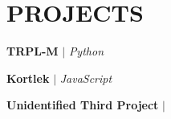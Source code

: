 \section{\textbf {\large PROJECTS}}
\resumeSubHeadingListStart %

    
    \resumeProjectHeading %
    {\textbf{TRPL-M} $|$ \emph{Python}}{}
    \resumeItemListStart %
        \resumeItem{}
        \resumeItem{}
        \resumeItem{}
    \resumeItemListEnd %

    \resumeProjectHeading %
    {\textbf{Kortlek} $|$ \emph{JavaScript}}{}
    \resumeItemListStart %
        \resumeItem{}
        \resumeItem{}
        \resumeItem{}
    \resumeItemListEnd %

    \resumeProjectHeading %
    {\textbf{Unidentified Third Project} $|$ \emph{}}{}
    \resumeItemListStart %
        \resumeItem{}
        \resumeItem{}
        \resumeItem{}
    \resumeItemListEnd %

\resumeSubHeadingListEnd %